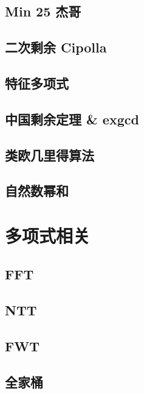 \documentclass[a4paper,12pt]{article}
\begin{document}
\subsection{Min 25 杰哥}

\subsection{二次剩余 Cipolla}

\subsection{特征多项式}

\subsection{中国剩余定理 \& exgcd}

\subsection{类欧几里得算法}

\subsection{自然数幂和}


\section{多项式相关}

\subsection{FFT}

\subsection{NTT}

\subsection{FWT}

\subsection{全家桶}

\end{document}
